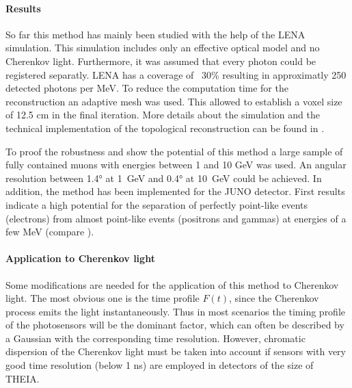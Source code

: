 
 
 
  
  \paragraph{Results}
  
  So far this method has mainly been studied with the help of the LENA simulation. This simulation includes only an effective optical model and 
  no Cherenkov light. Furthermore, it was assumed that every photon could be registered separatly. LENA has a coverage of ~30\% resulting in 
  approximatly 250 detected photons per MeV. To reduce the computation time for the reconstruction an adaptive mesh was used. This allowed to 
  establish a voxel size of 12.5 cm in the final iteration. More details about the simulation and the technical implementation of the topological
  reconstruction can be found in \cite{Wonsak:2018uby}.
  
  To proof the robustness and show the potential of this method a large sample of fully contained muons with energies between 1 and 10 GeV was 
  used. An angular resolution between 1.4° at 1~GeV and 0.4° at 10~GeV could be achieved. In addition, the method has been implemented for the JUNO \cite{An:2015jdp}
  detector. First results indicate a high potential for the separation of perfectly point-like events (electrons) from almost point-like events 
  (positrons and gammas) at energies of a few MeV (compare \cite{bwon18}).
  
\paragraph{Application to Cherenkov light}
  
  Some modifications are needed for the application of this method to Cherenkov light. The most obvious one is the 
  time profile $F(t)$, since the Cherenkov process emits the light instantaneously. Thus in most scenarios the timing profile of the photosensors will be the dominant
  factor, which can often be described by a Gaussian with the corresponding time resolution. However, chromatic 
  dispersion of the Cherenkov light must be taken into account if sensors with very good time resolution 
  (below 1 ns) are employed in detectors of the size of THEIA. 
  
